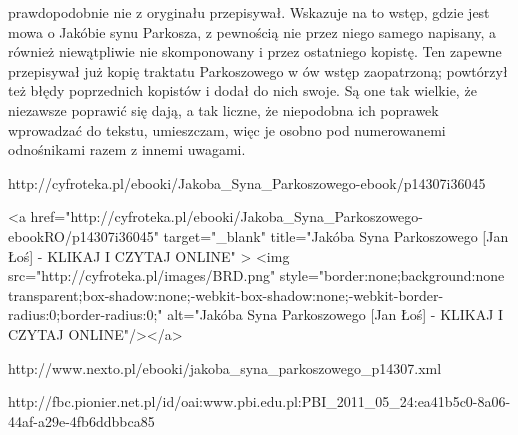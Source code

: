 prawdopodobnie nie z oryginału przepisywał. Wskazuje na to wstęp, gdzie jest mowa o Jakóbie synu Parkosza, z pewnością nie przez niego samego napisany, a również niewątpliwie nie skomponowany i przez ostatniego kopistę. Ten zapewne przepisywał już kopię traktatu Parkoszowego w ów wstęp zaopatrzoną; powtórzył też błędy poprzednich kopistów i dodał do nich swoje. Są one tak wielkie, że niezawsze poprawić się dają, a tak liczne, że niepodobna ich poprawek wprowadzać do tekstu, umieszczam, więc je osobno pod numerowanemi odnośnikami razem z innemi uwagami.

http://cyfroteka.pl/ebooki/Jakoba_Syna_Parkoszowego-ebook/p14307i36045

<a href="http://cyfroteka.pl/ebooki/Jakoba_Syna_Parkoszowego-ebookRO/p14307i36045" target="_blank" title="Jakóba Syna Parkoszowego [Jan Łoś]  - KLIKAJ I CZYTAJ ONLINE" > <img src="http://cyfroteka.pl/images/BRD.png" style="border:none;background:none transparent;box-shadow:none;-webkit-box-shadow:none;-webkit-border-radius:0;border-radius:0;" alt="Jakóba Syna Parkoszowego [Jan Łoś]  - KLIKAJ I CZYTAJ ONLINE"/></a>

http://www.nexto.pl/ebooki/jakoba_syna_parkoszowego_p14307.xml

http://fbc.pionier.net.pl/id/oai:www.pbi.edu.pl:PBI_2011_05_24:ea41b5c0-8a06-44af-a29e-4fb6ddbbca85

